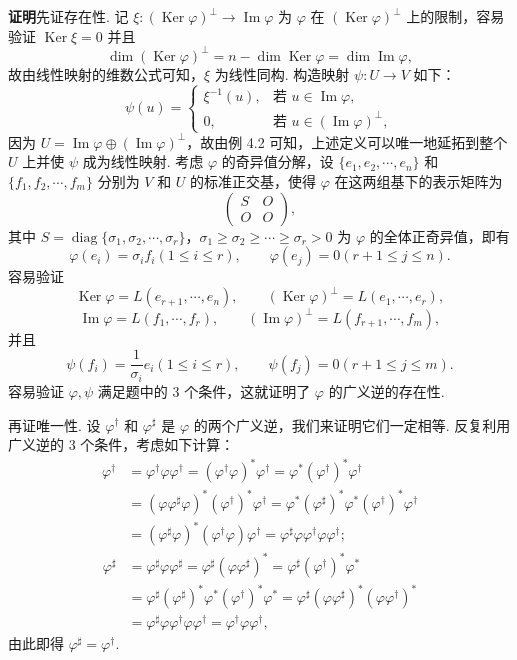 \documentclass[UTF8,12pt,a4paper,fontset=fandol]{ctexart}
\begin{document}
\noindent\textbf{证明}\quad 先证存在性. 记 $\xi:(\operatorname{Ker}\varphi)^\perp\to\operatorname{Im}\varphi$ 为 $\varphi$ 在 $(\operatorname{Ker}\varphi)^\perp$ 上的限制，容易验证 $\operatorname{Ker}\xi=0$ 并且
\[
\dim(\operatorname{Ker}\varphi)^\perp=n-\dim\operatorname{Ker}\varphi=\dim\operatorname{Im}\varphi,
\]
故由线性映射的维数公式可知，$\xi$ 为线性同构. 构造映射 $\psi:U\to V$ 如下：
\[
\psi(u)=
\begin{cases}
\xi^{-1}(u),&\text{若 }u\in\operatorname{Im}\varphi,\\
0,&\text{若 }u\in(\operatorname{Im}\varphi)^\perp,
\end{cases}
\]
因为 $U=\operatorname{Im}\varphi\oplus(\operatorname{Im}\varphi)^\perp$，故由例 4.2 可知，上述定义可以唯一地延拓到整个 $U$ 上并使 $\psi$ 成为线性映射. 考虑 $\varphi$ 的奇异值分解，设 $\{e_1,e_2,\cdots,e_n\}$ 和 $\{f_1,f_2,\cdots,f_m\}$ 分别为 $V$ 和 $U$ 的标准正交基，使得 $\varphi$ 在这两组基下的表示矩阵为
\[
\begin{pmatrix}
S&O\\
O&O
\end{pmatrix},
\]
其中 $S=\operatorname{diag}\{\sigma_1,\sigma_2,\cdots,\sigma_r\}$，$\sigma_1\ge\sigma_2\ge\cdots\ge\sigma_r>0$ 为 $\varphi$ 的全体正奇异值，即有
\[
\varphi(e_i)=\sigma_if_i(1\le i\le r),\qquad \varphi(e_j)=0(r+1\le j\le n).
\]
容易验证
\[
\operatorname{Ker}\varphi=L(e_{r+1},\cdots,e_n),\qquad
(\operatorname{Ker}\varphi)^\perp=L(e_1,\cdots,e_r),
\]
\[
\operatorname{Im}\varphi=L(f_1,\cdots,f_r),\qquad
(\operatorname{Im}\varphi)^\perp=L(f_{r+1},\cdots,f_m),
\]
并且
\[
\psi(f_i)=\frac{1}{\sigma_i}e_i(1\le i\le r),\qquad \psi(f_j)=0(r+1\le j\le m).
\]
容易验证 $\varphi,\psi$ 满足题中的 $3$ 个条件，这就证明了 $\varphi$ 的广义逆的存在性.

再证唯一性. 设 $\varphi^\dagger$ 和 $\varphi^\sharp$ 是 $\varphi$ 的两个广义逆，我们来证明它们一定相等. 反复利用广义逆的 $3$ 个条件，考虑如下计算：
\[
\begin{aligned}
\varphi^\dagger
&=\varphi^\dagger\varphi\varphi^\dagger
=(\varphi^\dagger\varphi)^*\varphi^\dagger
=\varphi^*(\varphi^\dagger)^*\varphi^\dagger\\
&=(\varphi\varphi^\sharp\varphi)^*(\varphi^\dagger)^*\varphi^\dagger
=\varphi^*(\varphi^\sharp)^*\varphi^*(\varphi^\dagger)^*\varphi^\dagger\\
&=(\varphi^\sharp\varphi)^*(\varphi^\dagger\varphi)\varphi^\dagger
=\varphi^\sharp\varphi\varphi^\dagger\varphi\varphi^\dagger;
\end{aligned}
\]
\[
\begin{aligned}
\varphi^\sharp
&=\varphi^\sharp\varphi\varphi^\sharp
=\varphi^\sharp(\varphi\varphi^\sharp)^*
=\varphi^\sharp(\varphi^\dagger)^*\varphi^*\\
&=\varphi^\sharp(\varphi^\sharp)^*\varphi^*(\varphi^\dagger)^*\varphi^*
=\varphi^\sharp(\varphi\varphi^\sharp)^*(\varphi\varphi^\dagger)^*\\
&=\varphi^\sharp\varphi\varphi^\dagger\varphi\varphi^\dagger
=\varphi^\dagger\varphi\varphi^\dagger,
\end{aligned}
\]
由此即得 $\varphi^\sharp=\varphi^\dagger$.
\end{document}
